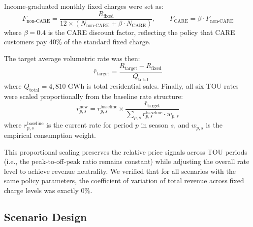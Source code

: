 \documentclass[12pt]{article}
\begin{document}
Income-graduated monthly fixed charges were set as:
\begin{equation}
F_{\text{non-CARE}} = \frac{R_{\text{fixed}}}{12 \times (N_{\text{non-CARE}} + \beta \cdot N_{\text{CARE}})}, \qquad F_{\text{CARE}} = \beta \cdot F_{\text{non-CARE}}
\end{equation}
where $\beta = 0.4$ is the CARE discount factor, reflecting the policy that CARE customers pay 40\% of the standard fixed charge.

The target average volumetric rate was then:
\begin{equation}
\bar{r}_{\text{target}} = \frac{R_{\text{target}} - R_{\text{fixed}}}{Q_{\text{total}}}
\end{equation}
where $Q_{\text{total}} = 4{,}810$ GWh is total residential sales. Finally, all six TOU rates were scaled proportionally from the baseline rate structure:
\begin{equation}
r_{p,s}^{\text{new}} = r_{p,s}^{\text{baseline}} \times \frac{\bar{r}_{\text{target}}}{\sum_{p,s} r_{p,s}^{\text{baseline}} \cdot w_{p,s}}
\end{equation}
where $r_{p,s}^{\text{baseline}}$ is the current rate for period $p$ in season $s$, and $w_{p,s}$ is the empirical consumption weight.

This proportional scaling preserves the relative price signals across TOU periods (i.e., the peak-to-off-peak ratio remains constant) while adjusting the overall rate level to achieve revenue neutrality. We verified that for all scenarios with the same policy parameters, the coefficient of variation of total revenue across fixed charge levels was exactly 0\%.

\subsection{Scenario Design}
\end{document}
